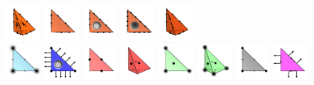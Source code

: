 \begin{frame}
\includegraphics[width=1.3cm]{png/NED1_2_3d.png}
\includegraphics[width=1.3cm]{png/NED2_1_2d.png}
\includegraphics[width=1.3cm]{png/NED2_2_2d.png}
\includegraphics[width=1.3cm]{png/NED2_3_2d.png}
\includegraphics[width=1.3cm]{png/NED2_1_3d.png} \\
\includegraphics[width=1.3cm]{png/ARG5_2d.png}
\includegraphics[width=1.3cm]{png/AW_2d.png}
\includegraphics[width=1.3cm]{png/CR1_2d.png}
\includegraphics[width=1.3cm]{png/CR1_3d.png}
\includegraphics[width=1.3cm]{png/HER_2d.png}
\includegraphics[width=1.3cm]{png/HER_3d.png}
\includegraphics[width=1.3cm]{png/MOR_2d.png}
\includegraphics[width=1.3cm]{png/MTW_2d.png}

\end{frame}
